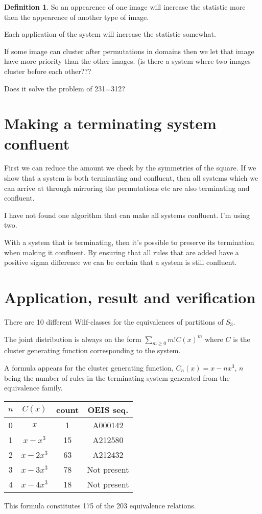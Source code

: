 \documentclass[a4paper, 11pt]{article}
\theoremstyle{definition}
\newtheorem{definition}[theorem]{Definition}
\begin{document}
\begin{definition}
    So an appearence of one image will increase the statistic more then the
    appearence of another type of image.

    Each application of the system will increase the statistic somewhat.

    If some image can cluster after permutations in domains then we let that
    image have more priority than the other images. (is there a system where two
    images cluster before each other???

    Does it solve the problem of 231=312?
\end{definition}

\section{Making a terminating system confluent}
First we can reduce the amount we check by the symmetries of the square.
If we show that a system is both terminating and confluent, then all systems
which we can arrive at through mirroring the permutations etc are also
terminating and confluent.

I have not found one algorithm that can make all systems confluent.
I'm using two.

With a system that is terminating, then it's possible to preserve its
termination when making it confluent.
By ensuring that all rules that are added have a positive sigma difference
we can be certain that a system is still confluent. 


\section{Application, result and verification}
There are 10 different Wilf-classes for the equivalences of partitions of $S_3$.

The joint distribution is always on the form $\sum_{m \geq 0}m!C(x)^m$ where $C$
is the cluster generating function corresponding to the system.

A formula appears for the cluster generating function, $C_n(x) = x-nx^3$, $n$ being the number of rules
in the terminating system generated from the equivalence family.
\begin{center}
\begin{tabular}{c|c|c|c}
    $n$ & $C(x)$ & count & OEIS seq. \\
    \hline
    0 & $x$ & 1 & A000142 \\
    1 & $x-x^3$ & 15 & A212580 \\
    2 & $x-2x^3$ & 63 & A212432 \\
    3 & $x-3x^3$ & 78 & Not present \\
    4 & $x-4x^3$ & 18 & Not present \\
\end{tabular}
\end{center}
This formula constitutes 175 of the 203 equivalence relations.
\end{document}
